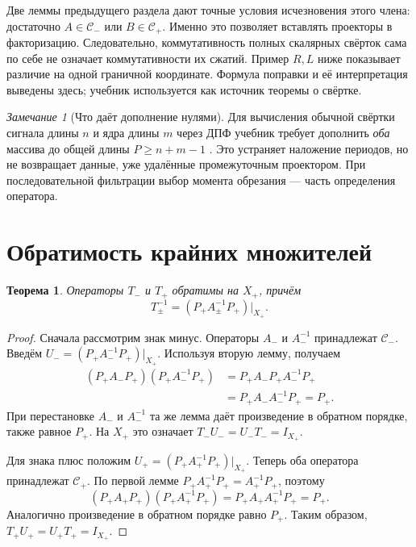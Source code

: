 \documentclass[12pt,a4paper]{article}
\newtheorem{theorem}{Теорема}
\theoremstyle{definition}
\theoremstyle{remark}
\newtheorem*{remark}{Замечание}
\newcommand{\Conv}{\mathcal C}
\begin{document}
Две леммы предыдущего раздела дают точные условия исчезновения
этого члена: достаточно $A\in\Conv_-$ или $B\in\Conv_+$.
Именно это позволяет вставлять проекторы в факторизацию.
Следовательно, коммутативность полных скалярных свёрток сама
по себе не означает коммутативности их сжатий. Пример $R,L$
ниже показывает различие на одной граничной координате.
Формула поправки и её интерпретация выведены здесь;
учебник используется как источник теоремы о свёртке.

\begin{remark}[Что даёт дополнение нулями]
Для вычисления обычной свёртки сигнала длины $n$ и ядра длины $m$
через ДПФ учебник требует дополнить \emph{оба} массива до общей
длины $P\geqslant n+m-1$
\cite[\S\,4.6.6, с.~300, формула (4.6-26)]{GW2012}.
Это устраняет наложение периодов, но не возвращает данные,
уже удалённые промежуточным проектором. При последовательной
фильтрации выбор момента обрезания --- часть определения оператора.
\end{remark}

\section{Обратимость крайних множителей}

\begin{theorem}
Операторы $T_-$ и $T_+$ обратимы на $X_+$, причём
\[
  \boxed{T_\pm^{-1}=(P_+A_\pm^{-1}P_+)\big|_{X_+}}.
\]
\end{theorem}

\begin{proof}
Сначала рассмотрим знак минус. Операторы $A_-$ и $A_-^{-1}$
принадлежат $\Conv_-$. Введём $U_-=(P_+A_-^{-1}P_+)|_{X_+}$.
Используя вторую лемму, получаем
\begin{align*}
  (P_+A_-P_+)(P_+A_-^{-1}P_+)
  &=P_+A_-P_+A_-^{-1}P_+\\
  &=P_+A_-A_-^{-1}P_+=P_+.
\end{align*}
При перестановке $A_-$ и $A_-^{-1}$ та же лемма даёт произведение
в обратном порядке, также равное $P_+$. На $X_+$ это означает
$T_-U_-=U_-T_-=I_{X_+}$.

Для знака плюс положим $U_+=(P_+A_+^{-1}P_+)|_{X_+}$.
Теперь оба оператора принадлежат $\Conv_+$. По первой лемме
$P_+A_+^{-1}P_+=A_+^{-1}P_+$, поэтому
\[
  (P_+A_+P_+)(P_+A_+^{-1}P_+)
  =P_+A_+A_+^{-1}P_+=P_+.
\]
Аналогично произведение в обратном порядке равно $P_+$.
Таким образом, $T_+U_+=U_+T_+=I_{X_+}$.
\end{proof}
\end{document}
